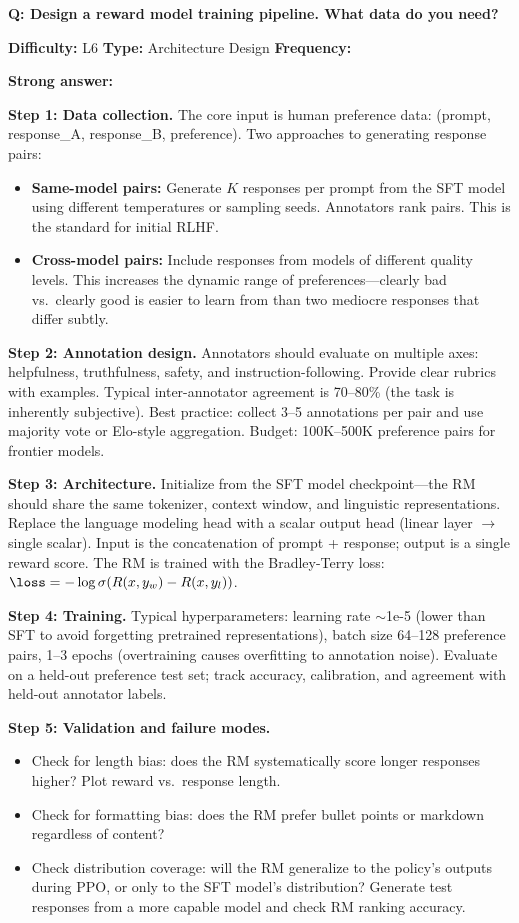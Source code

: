 \begin{interviewq}
\textbf{Q: Design a reward model training pipeline. What data do you need?}

\textbf{Difficulty:} L6 \quad \textbf{Type:} Architecture Design \quad \textbf{Frequency:} \freqmed{}

\textbf{Strong answer:}

\textbf{Step 1: Data collection.} The core input is human preference data: (prompt, response\_A, response\_B, preference). Two approaches to generating response pairs:
\begin{itemize}
    \item \textbf{Same-model pairs:} Generate $K$ responses per prompt from the SFT model using different temperatures or sampling seeds. Annotators rank pairs. This is the standard for initial RLHF.
    \item \textbf{Cross-model pairs:} Include responses from models of different quality levels. This increases the dynamic range of preferences---clearly bad vs.\ clearly good is easier to learn from than two mediocre responses that differ subtly.
\end{itemize}

\textbf{Step 2: Annotation design.} Annotators should evaluate on multiple axes: helpfulness, truthfulness, safety, and instruction-following. Provide clear rubrics with examples. Typical inter-annotator agreement is 70--80\% (the task is inherently subjective). Best practice: collect 3--5 annotations per pair and use majority vote or Elo-style aggregation. Budget: 100K--500K preference pairs for frontier models.

\textbf{Step 3: Architecture.} Initialize from the SFT model checkpoint---the RM should share the same tokenizer, context window, and linguistic representations. Replace the language modeling head with a scalar output head (linear layer $\rightarrow$ single scalar). Input is the concatenation of prompt + response; output is a single reward score. The RM is trained with the Bradley-Terry loss: $\loss = -\log\sigma(R(x, y_w) - R(x, y_l))$.

\textbf{Step 4: Training.} Typical hyperparameters: learning rate $\sim$1e-5 (lower than SFT to avoid forgetting pretrained representations), batch size 64--128 preference pairs, 1--3 epochs (overtraining causes overfitting to annotation noise). Evaluate on a held-out preference test set; track accuracy, calibration, and agreement with held-out annotator labels.

\textbf{Step 5: Validation and failure modes.}
\begin{itemize}
    \item Check for length bias: does the RM systematically score longer responses higher? Plot reward vs.\ response length.
    \item Check for formatting bias: does the RM prefer bullet points or markdown regardless of content?
    \item Check distribution coverage: will the RM generalize to the policy's outputs during PPO, or only to the SFT model's distribution? Generate test responses from a more capable model and check RM ranking accuracy.
\end{itemize}


\end{interviewq}
